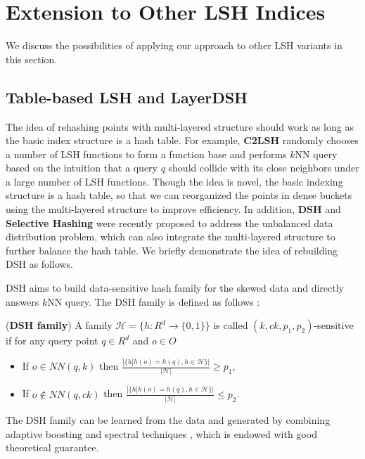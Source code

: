 \section{Extension to Other LSH Indices}
\label{sec:extension}

We discuss the possibilities of applying our approach to other LSH variants in this section.

\subsection{Table-based LSH and LayerDSH}
\label{sec:extension:dsh}

The idea of rehashing points with multi-layered structure should work as long as the basic index structure is a hash table.
For example, \textbf{C2LSH} \cite{c2lsh} randomly chooses a number of LSH functions to form a function base and performs $k$NN query based on the intuition that a query $q$ should collide with its close neighbors under a large number of LSH functions. Though the idea is novel, the basic indexing structure is a hash table, so that we can reorganized the points in dense buckets using the multi-layered structure to improve efficiency. In addition, \textbf{DSH} \cite{Gao:2014:DDS:2588555.2588565} and \textbf{Selective Hashing} \cite{Gao:2015:SHC:2783258.2783284} were recently proposed to address the unbalanced data distribution problem, which can also integrate the multi-layered structure to further balance the hash table. We briefly demonstrate the idea of rebuilding DSH as follows.


 DSH \cite{Gao:2014:DDS:2588555.2588565} aims to build data-sensitive hash family for the skewed data and directly answers $k$NN query. The DSH family is defined as follows \cite{Gao:2014:DDS:2588555.2588565}:
\begin{definition}
\label{def:dsh}
(\textbf{DSH family}) A family $\mathcal{H}=\{h:R^d\rightarrow\{0,1\}\}$ is called $(k,ck,p_1,p_2)$-sensitive if for any query point $q\in R^d$ and $o\in O$
\begin{itemize}
  \item If $o\in NN(q,k)$ then $\frac{|\{h|h(o)=h(q),h\in\mathcal{H}\}|}{|\mathcal{H}|}\geq p_1$,
  \item If $o\notin NN(q,ck)$ then $\frac{|\{h|h(o)=h(q),h\in\mathcal{H}\}|}{|\mathcal{H}|}\leq p_2$.
\end{itemize}
\end{definition}
The DSH family can be learned from the data and generated by combining adaptive boosting and spectral techniques \cite{Gao:2014:DDS:2588555.2588565}, which is endowed with good theoretical guarantee.


